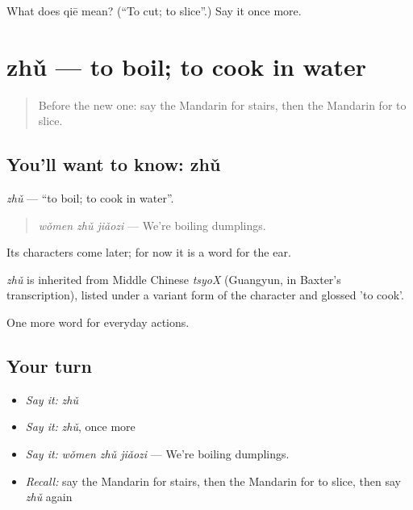 \begin{tcolorbox}[breakable,colback=teal!4,colframe=teal!35!black,title={Before you move on}]
What does qiē mean? (\textquotedblleft{}To cut; to slice\textquotedblright{}.) Say it once more.
\end{tcolorbox}
\section[zhǔ]{zhǔ — to boil; to cook in water}

\label{lesson:ZH-C113-zhu-boil}



\begin{quote}
Before the new one: say the Mandarin for stairs, then the Mandarin for to slice.
\end{quote}

\subsection*{You'll want to know: zhǔ}
\emph{zhǔ} — \textquotedblleft{}to boil; to cook in water\textquotedblright{}.

\begin{quote}
\emph{wǒmen zhǔ jiǎozi} — We're boiling dumplings.
\end{quote}

Its characters come later; for now it is a word for the ear.

\begin{cousinweb}
\emph{zhǔ} is inherited from Middle Chinese \emph{tsyoX} (Guangyun, in Baxter's transcription), listed under a variant form of the character and glossed 'to cook'.
\end{cousinweb}

\begin{grammarlens}[title={What you've built}]
One more word for everyday actions.
\end{grammarlens}

\subsection*{Your turn}
\begin{itemize}
\raggedright
  \item \emph{Say it:} \emph{zhǔ}
  \item \emph{Say it:} \emph{zhǔ}, once more
  \item \emph{Say it:} \emph{wǒmen zhǔ jiǎozi} — We're boiling dumplings.
  \item \emph{Recall:} say the Mandarin for stairs, then the Mandarin for to slice, then say \emph{zhǔ} again
\end{itemize}

